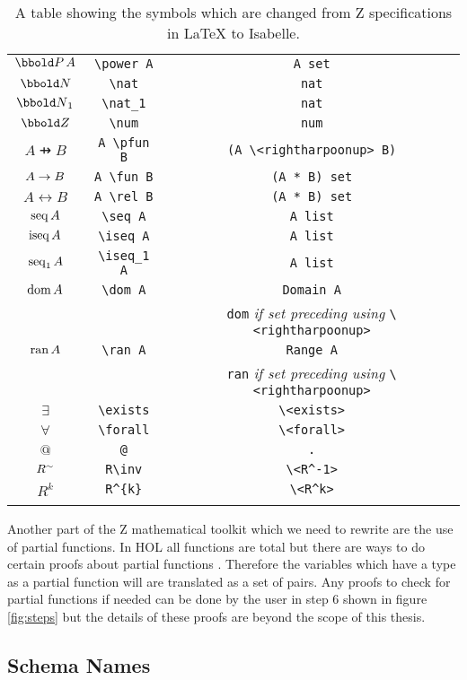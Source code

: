 {\begin{longtable}[H]{|c | c | c |}
$\power A$ & \verb|\power A| & \verb|A set| \\
$\nat$ & \verb|\nat| & \verb|nat| \\
$\nat_1$ & \verb|\nat_1| & \verb|nat| \\
$\num$ & \verb|\num| & \verb|num| \\
$A \pfun B$ & \verb|A \pfun B| & \verb|(A \<rightharpoonup> B)| \\
$A \rightarrow B$ & \verb|A \fun B| & \verb|(A * B) set| \\
$A \rel B$ & \verb|A \rel B| & \verb|(A * B) set| \\
$\mathop{\mathrm{seq}} A$ & \verb|\seq A| & \verb|A list| \\
$\mathop{\mathrm{iseq}} A$ & \verb|\iseq A| & \verb|A list| \\
$\mathop{\mathrm{seq}}_1 A$ & \verb|\iseq_1 A| & \verb|A list| \\
$\mathop{\mathrm{dom}} A$ & \verb|\dom A| & \verb|Domain A| \\
& & \verb|dom| \textit{if set preceding using} \verb|\<rightharpoonup>| \\
$\mathop{\mathrm{ran}} A$ & \verb|\ran A| & \verb|Range A| \\
& & \verb|ran| \textit{if set preceding using} \verb|\<rightharpoonup>| \\
$\exists$ & \verb|\exists| & \verb|\<exists>| \\
$\forall$ & \verb|\forall| & \verb|\<forall>| \\
$@$ & \verb|@| & \verb|.| \\
$R^\sim$ & \verb|R\inv| & \verb|\<R^-1>| \\
$R^{k}$ & \verb|R^{k}| & \verb|\<R^k>| \\
\hline
\caption{A table showing the symbols which are changed from Z specifications in \LaTeX{} to Isabelle.}
\label{tab:latextoisabelle}
\end{longtable}
}

Another part of the Z mathematical toolkit which we need to rewrite are the use of partial functions. In HOL all functions are total but there are ways to do certain proofs about partial functions \cite{Krauss08definingrecursive}. Therefore the variables which have a type as a partial function will are translated as a set of pairs. Any proofs to check for partial functions if needed can be done by the user in step 6 shown in figure \ref{fig:steps} but the details of these proofs are beyond the scope of this thesis.

\subsection{Schema Names}

